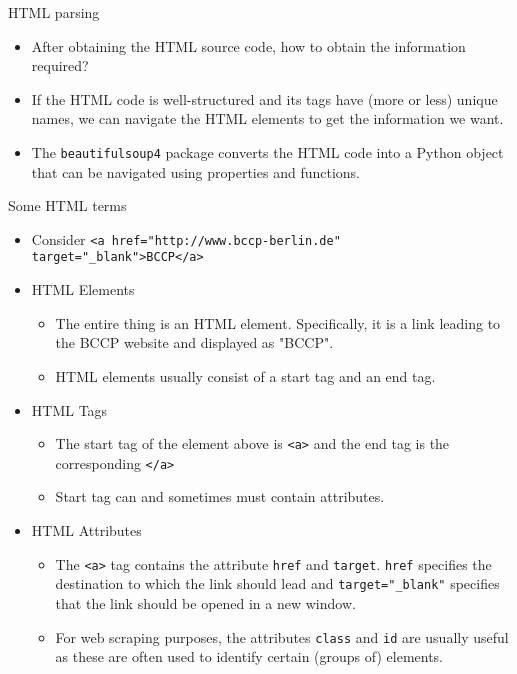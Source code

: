 \begin{frame}{HTML parsing}
\begin{itemize}
	\item After obtaining the HTML source code, how to obtain the information required?
	\item If the HTML code is well-structured and its tags have (more or less) unique names, we can navigate the HTML elements to get the information we want.
	\item The {\tt beautifulsoup4} package converts the HTML code into a Python object that can be navigated using properties and functions.
\end{itemize}
\end{frame}

\begin{frame}{Some HTML terms}
\begin{itemize}
	\item Consider {\tt <a href="http://www.bccp-berlin.de" target="\_blank">BCCP</a>}
	\item HTML Elements
	\begin{itemize}
		\item The entire thing is an HTML element. Specifically, it is a link leading to the BCCP website and displayed as "BCCP".
		\item HTML elements usually consist of a start tag and an end tag.
	\end{itemize}
	\item HTML Tags
	\begin{itemize}
		\item The start tag of the element above is {\tt <a>} and the end tag is the corresponding {\tt </a>}
		\item Start tag can and sometimes must contain attributes.
	\end{itemize}
	\item HTML Attributes
	\begin{itemize}
		\item The {\tt <a>} tag contains the attribute {\tt href} and {\tt target}. {\tt href} specifies the destination to which the link should lead and {\tt target="\_blank"} specifies that the link should be opened in a new window.
		\item For web scraping purposes, the attributes {\tt class} and {\tt id} are usually useful as these are often used to identify certain (groups of) elements.
	\end{itemize}
\end{itemize}
\end{frame}


